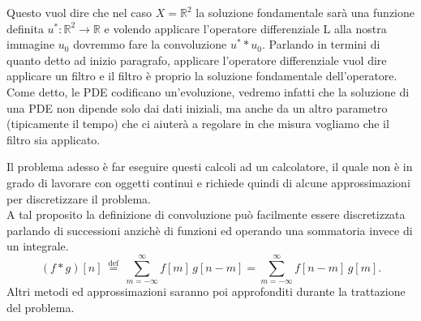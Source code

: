 \noindent
Questo vuol dire che nel caso $X=\mathbb R^2$ la soluzione fondamentale sarà una funzione definita  $u^*:\mathbb R^2\rightarrow\mathbb R$ e volendo applicare l'operatore differenziale L alla nostra immagine $u_0$ dovremmo fare la convoluzione $u^**u_0$. Parlando in termini di quanto detto ad inizio paragrafo, applicare l'operatore differenziale vuol dire applicare un filtro e il filtro è proprio la soluzione fondamentale dell'operatore.\\
\noindent
Come detto, le PDE codificano un'evoluzione, vedremo infatti che la soluzione di una PDE non dipende solo dai dati iniziali, ma anche da un altro parametro (tipicamente il tempo) che ci aiuterà a regolare in che misura vogliamo che il filtro sia applicato.




\noindent
Il problema adesso è far eseguire questi calcoli ad un calcolatore, il quale non è in grado di lavorare con oggetti continui e richiede quindi di alcune approssimazioni per discretizzare il problema.\\
A tal proposito la definizione di convoluzione può facilmente essere discretizzata parlando di successioni anzichè di funzioni ed operando una sommatoria invece di un integrale.\\
$$
(f*g)[n]\ {\stackrel {{\mathrm {def}}}{=}}\ \sum _{{m=-\infty }}^{\infty }f[m]\,g[n-m]=\sum _{{m=-\infty }}^{\infty }f[n-m]\,g[m].
$$
\noindent
Altri metodi ed approssimazioni saranno poi approfonditi durante la trattazione del problema.


